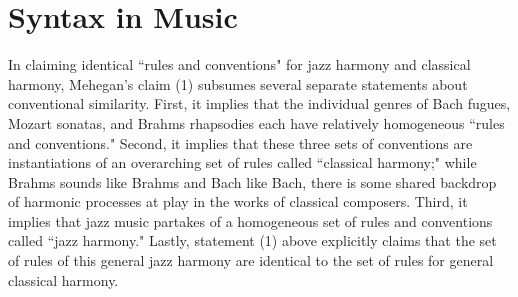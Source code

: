 \section{Syntax in Music}%

In claiming identical ``rules and conventions" for jazz harmony and classical harmony, Mehegan's claim (1) subsumes several separate statements about conventional similarity.  First, it implies that the individual genres of Bach fugues, Mozart sonatas, and Brahms rhapsodies each have relatively homogeneous ``rules and conventions."  Second, it implies that these three sets of conventions are instantiations of an overarching set of rules called ``classical harmony;" while Brahms sounds like Brahms and Bach like Bach, there is some shared backdrop of harmonic processes at play in the works of classical composers.  Third, it implies that jazz music partakes of a homogeneous set of rules and conventions called ``jazz harmony."  Lastly, statement (1) above explicitly claims that the set of rules of this general jazz harmony are identical to the set of rules for general classical harmony.

